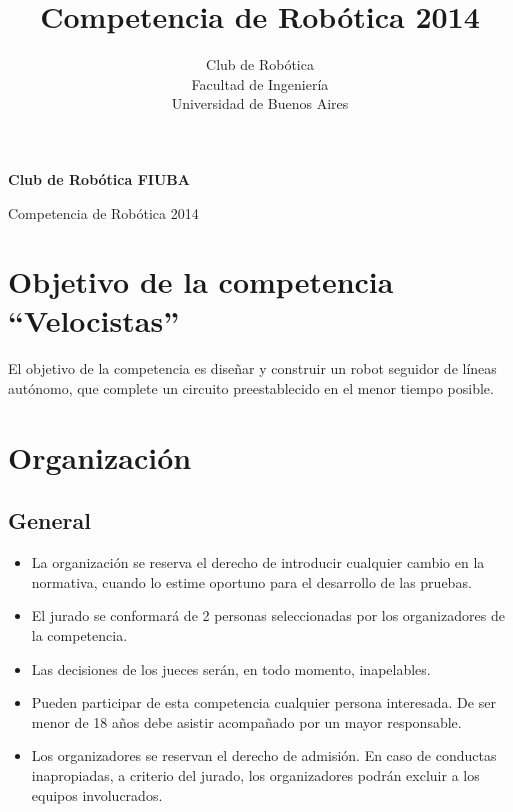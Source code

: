 \documentclass[a4paper,11pt]{article}
\author{Club de Robótica \\ Facultad de Ingeniería \\ Universidad de Buenos Aires}
\title{Competencia de Robótica 2014}
\begin{document}
\begin{center}
  {\Huge \textbf{Club de Robótica FIUBA}}
  \vspace{0.5cm}

  {\huge Competencia de Robótica 2014}
\end{center}

\section*{Objetivo de la competencia ``Velocistas''}
El objetivo de la competencia es diseñar y construir un robot seguidor de líneas autónomo, que complete un circuito preestablecido en el menor tiempo posible.
\section*{Organización}
\subsection*{General}
\begin{itemize}
  \item La organización se reserva el derecho de introducir cualquier cambio en la normativa, cuando lo estime oportuno para el desarrollo de las pruebas.
  \item El jurado se conformará de 2 personas seleccionadas por los organizadores de la competencia.
  \item Las decisiones de los jueces serán, en todo momento, inapelables.
  \item Pueden participar de esta competencia cualquier persona interesada. De ser menor de 18 años debe asistir acompañado por un mayor responsable.
  \item Los organizadores se reservan el derecho de admisión. En caso de conductas inapropiadas, a criterio del jurado, los organizadores podrán excluir a los equipos involucrados.
\end{itemize}
\end{document}
